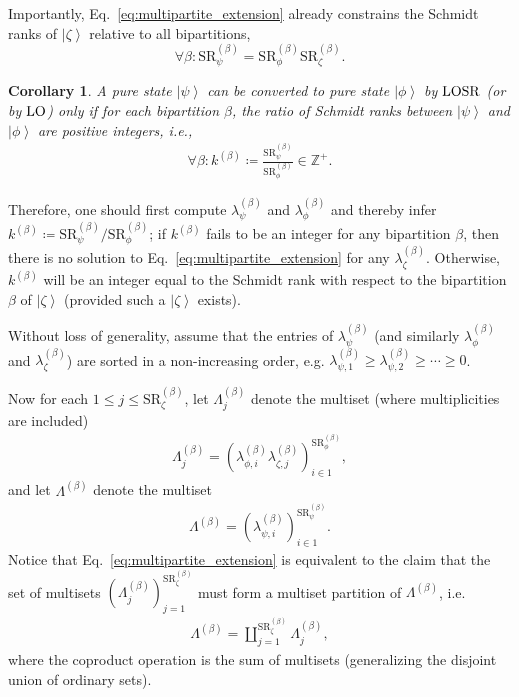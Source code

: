\documentclass[prx,11pt,letterpaper,twocolumn,accepted=2023-11-27]{quantumarticle}
\newcommand{\rob}{\color{black}}
\newcommand{\ket}[1]{\left| #1 \right>}
\newcommand{\LOSR}[0]{\ifmmode\textup{\upshape LOSR}\else{\textup{\upshape LOSR}}\fi}
\newcommand{\LO}[0]{\ifmmode\textup{\upshape LO}\else{\textup{\upshape LO}}\fi}
\theoremstyle{plain}
\newtheorem{cor}[theo]{Corollary}
\theoremstyle{definition}
\begin{document}
\begin{appendices}
Importantly, Eq.~\eqref{eq:multipartite_extension} already constrains the Schmidt ranks of $\ket{\zeta}$ relative to all bipartitions,
\[ \forall \beta: \mathrm{SR}_{\psi}^{(\beta)} = \mathrm{SR}_{\phi}^{(\beta)} \mathrm{SR}_{\zeta}^{(\beta)}. \]

\begin{cor} 
    \label{rankcoro}
    A pure state $\ket \psi$ can be converted to pure state $\ket \phi$ by $\LOSR$ (or by $\LO$) only if for each bipartition $\beta$, the ratio of Schmidt ranks between $\ket \psi$ and $\ket \phi$ are positive integers, i.e.,
    \begin{align}
        \forall \beta : k^{(\beta)} \coloneqq \frac{\mathrm{SR}_{\psi}^{(\beta)}}{\mathrm{SR}_{\phi}^{(\beta)}} \in \mathbb Z^+.
    \end{align}
\end{cor}

Therefore, one should first compute $\lambda_{\psi}^{(\beta)}$ and $\lambda_{\phi}^{(\beta)}$ and thereby infer
$k^{(\beta)} \coloneqq \mathrm{SR}_{\psi}^{(\beta)} / \mathrm{SR}_{\phi}^{(\beta)}$;
if $k^{(\beta)}$
fails to be an integer for any bipartition $\beta$, then there is no solution to Eq.~\eqref{eq:multipartite_extension} for any $\lambda_{\zeta}^{(\beta)}$.
\rob Otherwise, $k^{(\beta)}$ will be an integer equal to the Schmidt rank with respect to the bipartition $\beta$ of $\ket{\zeta}$ (provided such a $\ket{\zeta}$ exists).

Without loss of generality, assume that the entries of $\lambda_{\psi}^{(\beta)}$ (and similarly $\lambda_{\phi}^{(\beta)}$ and $\lambda_{\zeta}^{(\beta)}$) are sorted in a non-increasing order, e.g. $\lambda_{\psi, 1}^{(\beta)} \geq \lambda_{\psi, 2}^{(\beta)} \geq \cdots \geq 0$.

Now for each $1 \leq j \leq \mathrm{SR}_{\zeta}^{(\beta)}$, let $\Lambda_{j}^{(\beta)}$ denote the multiset (where multiplicities are included)
\begin{align}
    \Lambda_{j}^{(\beta)} = (\lambda_{\phi,i}^{(\beta)}\lambda_{\zeta,j}^{(\beta)})_{i \in 1}^{\mathrm{SR}_{\phi}^{(\beta)}},
\end{align}
and let $\Lambda^{(\beta)}$ denote the multiset
\begin{align}
    \Lambda^{(\beta)} = (\lambda_{\psi,i}^{(\beta)})_{i \in 1}^{\mathrm{SR}_{\psi}^{(\beta)}}.
\end{align}
Notice that Eq.~\eqref{eq:multipartite_extension} is equivalent to the claim that the set of multisets $(\Lambda_{j}^{(\beta)})_{j = 1}^{\mathrm{SR}_{\zeta}^{(\beta)}}$ must form a multiset partition of $\Lambda^{(\beta)}$, i.e.
\begin{align}
    \label{eq:multiset_partition}
    \Lambda^{(\beta)} = \coprod_{j=1}^{\mathrm{SR}_{\zeta}^{(\beta)}}\Lambda_{j}^{(\beta)},
\end{align}
where the coproduct operation is the sum of multisets (generalizing the disjoint union of ordinary sets).


\end{appendices}
\end{document}
